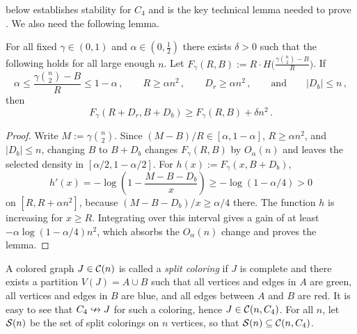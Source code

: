  below establishes stability for $C_4$ and is the key technical lemma needed to prove . We also need the following lemma.

\begin{lemma}\label{lemma:entropy-BOOST}
For all fixed $\gamma\in(0,1)$ and $\alpha\in(0,\frac{1}{2})$ there exists $\delta>0$ such that the following holds for all large enough $n$. Let $F_\gamma(R,B):=R\cdot H\big(\frac{\gamma\binom{n}{2}-B}{R}\big)$. If
$$\alpha\leq\frac{\gamma\binom{n}{2}-B}{R}\leq1-\alpha\,,\qquad R\geq\alpha n^2\,,\qquad D_r\geq\alpha n^2\,,\qquad\text{and}\qquad|D_b|\leq n\,,$$
then
$$F_\gamma(R+D_r,B+D_b)\geq F_\gamma(R,B)+\delta n^2\,.$$
\end{lemma}
\begin{proof}
Write $M:=\gamma\binom{n}{2}$. Since $(M-B)/R\in[\alpha,1-\alpha]$, $R\geq\alpha n^2$, and $|D_b|\leq n$, changing $B$ to $B+D_b$ changes $F_\gamma(R,B)$ by $O_\alpha(n)$ and leaves the selected density in $[\alpha/2,1-\alpha/2]$. For $h(x):=F_\gamma(x,B+D_b)$,
$$h'(x)=-\log\!\left(1-\frac{M-B-D_b}{x}\right)\geq-\log(1-\alpha/4)>0$$
on $[R,R+\alpha n^2]$, because $(M-B-D_b)/x\geq\alpha/4$ there. The function $h$ is increasing for $x\geq R$. Integrating over this interval gives a gain of at least $-\alpha\log(1-\alpha/4)n^2$, which absorbs the $O_\alpha(n)$ change and proves the lemma.
\end{proof}

A colored graph $J\in{\mathcal C}(n)$ is called a \emph{split coloring} if $J$ is complete and there exists a partition $V(J)=A\cup B$ such that all vertices and edges in $A$ are green, all vertices and edges in $B$ are blue, and all edges between $A$ and $B$ are red. It is easy to see that $C_4\nHookrightarrow J$ for such a coloring, hence $J\in{\mathcal C}(n,C_4)$. For all $n$, let ${\mathcal S}(n)$ be the set of split colorings on $n$ vertices, so that ${\mathcal S}(n)\subseteq{\mathcal C}(n,C_4)$.

